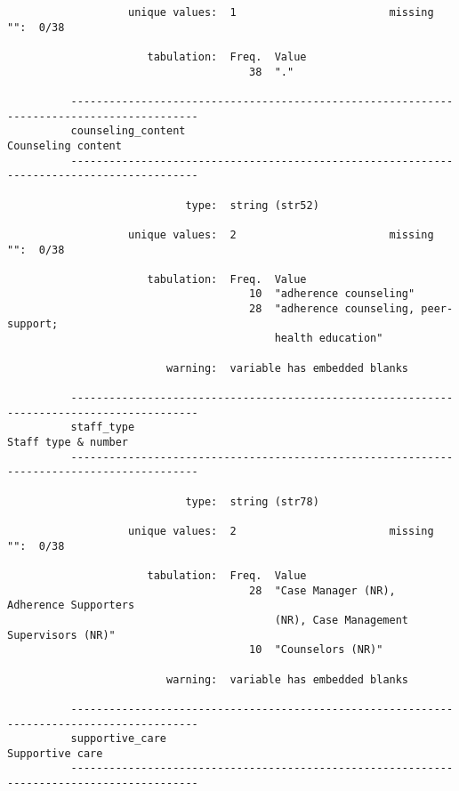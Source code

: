 \documentclass{article}
\begin{document}
\begin{verbatim}
                   unique values:  1                        missing "":  0/38
          
                      tabulation:  Freq.  Value
                                      38  "."
          
          ------------------------------------------------------------------------------------------
          counseling_content                                                      Counseling content
          ------------------------------------------------------------------------------------------
          
                            type:  string (str52)
          
                   unique values:  2                        missing "":  0/38
          
                      tabulation:  Freq.  Value
                                      10  "adherence counseling"
                                      28  "adherence counseling, peer-support;
                                          health education"
          
                         warning:  variable has embedded blanks
          
          ------------------------------------------------------------------------------------------
          staff_type                                                             Staff type & number
          ------------------------------------------------------------------------------------------
          
                            type:  string (str78)
          
                   unique values:  2                        missing "":  0/38
          
                      tabulation:  Freq.  Value
                                      28  "Case Manager (NR), Adherence Supporters
                                          (NR), Case Management Supervisors (NR)"
                                      10  "Counselors (NR)"
          
                         warning:  variable has embedded blanks
          
          ------------------------------------------------------------------------------------------
          supportive_care                                                            Supportive care
          ------------------------------------------------------------------------------------------
          

\end{verbatim}
\end{document}
